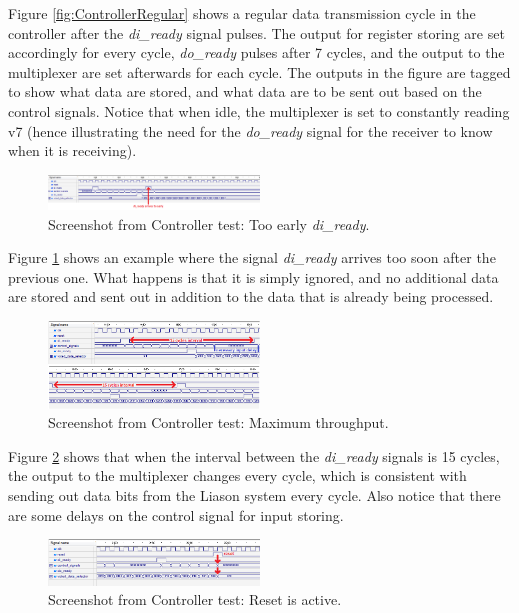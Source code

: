 \documentclass[a4paper]{IEEEtran}
\begin{document}
Figure \ref{fig:ControllerRegular} shows a regular data transmission cycle in the controller after the \textit{di\_ready} signal pulses.
The output for register storing are set accordingly for every cycle, \textit{do\_ready} pulses after 7 cycles, and the output to the multiplexer are set afterwards for each cycle. 
The outputs in the figure are tagged to show what data are stored, and what data are to be sent out based on the control signals.
Notice that when idle, the multiplexer is set to constantly reading v7 (hence illustrating the need for the \textit{do\_ready} signal for the receiver to know when it is receiving).

\begin{figure}[h!]
  \centering
      \includegraphics[width=0.5\textwidth]{Figures/Tests/ControllerTooEarlyDiReady}
  \caption{Screenshot from Controller test: Too early \textit{di\_ready}.}
  \label{fig:ControllerTooEarlyDiReady}
\end{figure}

Figure \ref{fig:ControllerTooEarlyDiReady} shows an example where the signal \textit{di\_ready} arrives too soon after the previous one.
What happens is that it is simply ignored, and no additional data are stored and sent out in addition to the data that is already being processed.

\begin{figure}[h!]
  \centering
      \includegraphics[width=0.5\textwidth]{Figures/Tests/ControllerThroughput}
  \caption{Screenshot from Controller test: Maximum throughput.}
  \label{fig:ControllerThroughput}
\end{figure}

Figure \ref{fig:ControllerThroughput} shows that when the interval between the \textit{di\_ready} signals is 15 cycles, the output to the multiplexer changes every cycle, which is consistent with sending out data bits from the Liason system every cycle.
Also notice that there are some delays on the control signal for input storing.

\begin{figure}[h!]
  \centering
      \includegraphics[width=0.5\textwidth]{Figures/Tests/ControllerReset}
  \caption{Screenshot from Controller test: Reset is active.}
  \label{fig:ControllerReset}
\end{figure}
\end{document}
